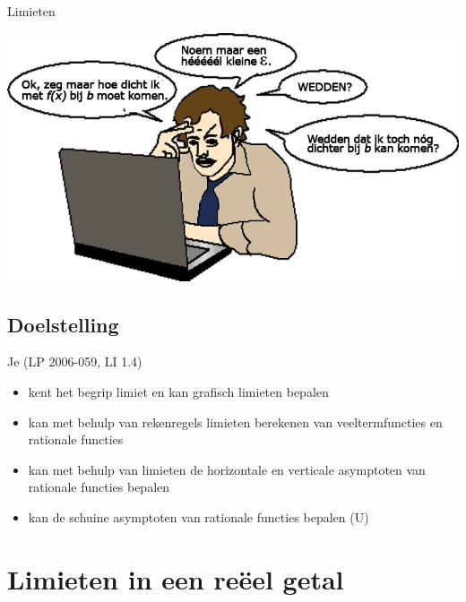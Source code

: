\documentclass[12pt]{article}
\begin{document}
\pagestyle{fancy}
\lhead{}

\begin{theorie}

\thispagestyle{empty}
\begin{center}
  \begin{mdframed}
    \centering
    \fontsize{50}{60}\selectfont Limieten
  \end{mdframed}
  \vfill
  \includegraphics[width=\textwidth]{limieten}
  \vfill
\end{center}

\subsection*{Doelstelling}
Je \hfill  {\scriptsize(LP 2006-059, LI 1.4)}
\begin{itemize}
\item kent het begrip limiet en kan grafisch limieten bepalen
\item kan met behulp van rekenregels limieten berekenen van veeltermfuncties en rationale functies
\item kan met behulp van limieten de horizontale en verticale asymptoten van rationale functies bepalen
\item kan de schuine asymptoten van rationale functies bepalen (U)
\end{itemize}

\thispagestyle{empty}
\mbox{}
\newpage
\clearpage
\thispagestyle{empty}
\tableofcontents
\newpage
\clearpage
{}

\lhead{}

\onehalfspacing

\end{theorie}

\section{Limieten in een reëel getal}
\end{document}
